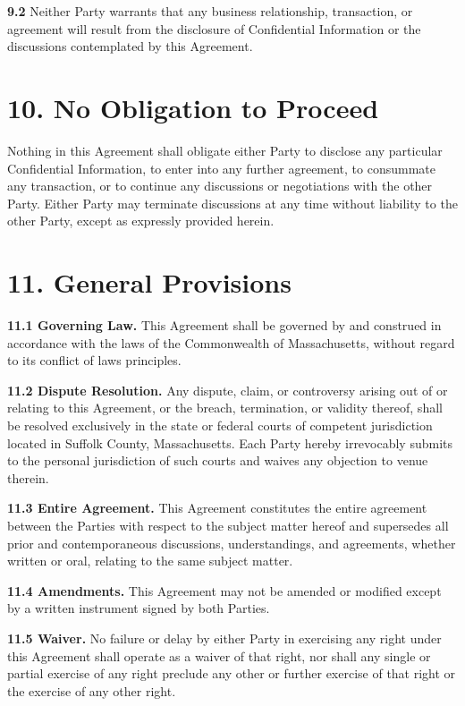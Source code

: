 \documentclass{article}
\begin{document}
\textbf{9.2} Neither Party warrants that any business relationship, transaction, or agreement will result from the disclosure of Confidential Information or the discussions contemplated by this Agreement.

\section{10. No Obligation to Proceed}

Nothing in this Agreement shall obligate either Party to disclose any particular Confidential Information, to enter into any further agreement, to consummate any transaction, or to continue any discussions or negotiations with the other Party. Either Party may terminate discussions at any time without liability to the other Party, except as expressly provided herein.

\section{11. General Provisions}

\textbf{11.1 Governing Law.} This Agreement shall be governed by and construed in accordance with the laws of the Commonwealth of Massachusetts, without regard to its conflict of laws principles.

\textbf{11.2 Dispute Resolution.} Any dispute, claim, or controversy arising out of or relating to this Agreement, or the breach, termination, or validity thereof, shall be resolved exclusively in the state or federal courts of competent jurisdiction located in Suffolk County, Massachusetts. Each Party hereby irrevocably submits to the personal jurisdiction of such courts and waives any objection to venue therein.

\textbf{11.3 Entire Agreement.} This Agreement constitutes the entire agreement between the Parties with respect to the subject matter hereof and supersedes all prior and contemporaneous discussions, understandings, and agreements, whether written or oral, relating to the same subject matter.

\textbf{11.4 Amendments.} This Agreement may not be amended or modified except by a written instrument signed by both Parties.

\textbf{11.5 Waiver.} No failure or delay by either Party in exercising any right under this Agreement shall operate as a waiver of that right, nor shall any single or partial exercise of any right preclude any other or further exercise of that right or the exercise of any other right.
\end{document}
